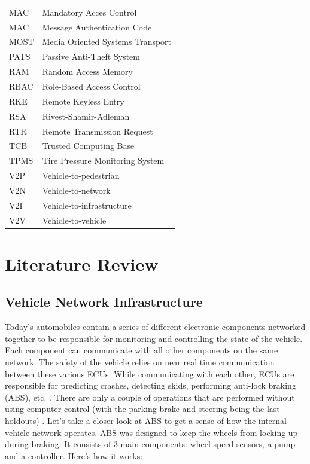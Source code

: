 \documentclass[master=cws,masteroption=vs,english]{kulemt}
\begin{document}
\begin{tabular}{ l l }
	MAC & Mandatory Acces Control \\
	MAC & Message Authentication Code \\
	MOST & Media Oriented Systems Transport \\
	PATS & Passive Anti-Theft System \\
	RAM & Random Access Memory \\
	RBAC & Role-Based Access Control \\
	RKE & Remote Keyless Entry \\
	RSA & Rivest-Shamir-Adleman \\
	RTR & Remote Transmission Request \\
	TCB & Trusted Computing Base \\
	TPMS & Tire Pressure Monitoring System \\
	V2P & Vehicle-to-pedestrian \\
	V2N & Vehicle-to-network \\
	V2I & Vehicle-to-infrastructure  \\
	V2V & Vehicle-to-vehicle \\
\end{tabular}

\newpage
\tableofcontents*

\mainmatter

  

\section{Literature Review}

\subsection{Vehicle Network Infrastructure}
\label{sec:vni}
Today's automobiles contain a series of different electronic components networked together to be responsible for monitoring and controlling the state of the vehicle. Each component can communicate with all other components on the same network. The safety of the vehicle relies on near real time communication between these various ECUs. While communicating with each other, ECUs are responsible for predicting crashes, detecting skids, performing anti-lock braking (ABS), etc. \cite{Yadav16}. There are only a couple of operations that are performed without using computer control (with the parking brake and steering being the last holdouts) \cite{Kosher}. Let's take a closer look at ABS to get a sense of how the internal vehicle network operates. ABS was designed to keep the wheels from locking up during braking. It consists of 3 main components: wheel speed sensors, a pump and a controller. Here's how it works\cite{wiki:ABS}:
\end{document}
